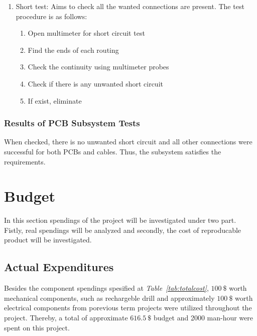 \documentclass[a4paper,12pt]{article}
\begin{document}
\begin{enumerate}

\item Short test: Aims to check all the wanted connections are present. The test procedure is as follows:

\begin{enumerate} 

\item Open multimeter for short circuit test  

\item Find the ends of each routing 

\item Check the continuity using multimeter probes

\item Check if there is any unwanted short circuit

\item If exist, eliminate

\end{enumerate}


\end{enumerate}

\subsubsection*{Results of PCB Subsystem Tests}
	When checked, there is no unwanted short circuit and all other connections were successful for both PCBs and cables. Thus, the subsystem satisfies the requirements.



\section{Budget}
		
	In this section spendings of the project will be investigated under two part. Fistly, real spendings will be analyzed and secondly, the cost of reproducable product will be investigated.

	\subsection{Actual Expenditures}
	
		Besides the component spendings spesified at \textit{Table~\ref{tab:totalcost}}, $100~\$$ worth mechanical components, such as rechargeble drill and approximately $100~\$$ worth electrical components from porevious term projects were utilized throughout the project. Thereby, a total of approximate $616.5~\$$ budget and  2000 man-hour were spent on this project.
		
\end{document}
